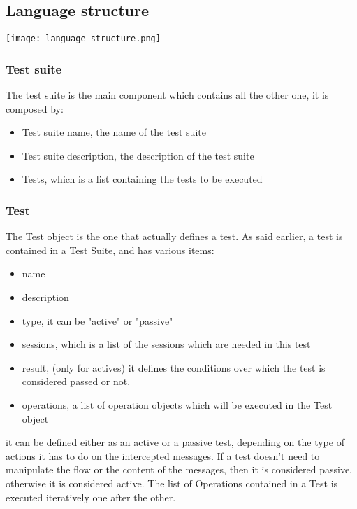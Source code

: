 \subsection{Language structure}
\texttt{[image: language\_structure.png]}

\subsubsection{Test suite}
The test suite is the main component which contains all the other one, it is composed by:
\begin{itemize}
    \item Test suite name, the name of the test suite
    \item Test suite description, the description of the test suite
    \item Tests, which is a list containing the tests to be executed
\end{itemize}

\subsubsection{Test}
The Test object is the one that actually defines a test. As said earlier, a test is contained in a Test Suite, and has various items:
\begin{itemize}
    \item name
    \item description
    \item type, it can be "active" or "passive"
    \item sessions, which is a list of the sessions which are needed in this test
    \item result, (only for actives) it defines the conditions over which the test is considered passed or not.
    \item operations, a list of operation objects which will be executed in the Test object
\end{itemize}

it can be defined either as an active or a passive test, depending on the type of actions it has to do on the intercepted messages. If a test doesn't need to manipulate the flow or the content of the messages, then it is considered passive, otherwise it is considered active.
The list of Operations contained in a Test is executed iteratively one after the other.

